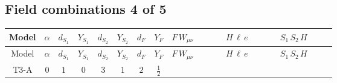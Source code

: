 \documentclass[8pt]{article}
\begin{document}
\begin{landscape}
\subsection*{Field combinations 4 of 5}
\begin{longtable}{@{}cccccccc >{\raggedright\arraybackslash}p{0.21\linewidth} >{\raggedright\arraybackslash}p{0.21\linewidth} >{\raggedright\arraybackslash}p{0.21\linewidth}@{}}
\toprule
Model & $\alpha$ & $d_{S_1}$ & $Y_{S_1}$ & $d_{S_2}$ & $Y_{S_2}$ & $d_F$ & $Y_F$ & $F\,W_{\mu\nu}$ & $H\,\ell\,e$ & $S_1\,S_2\,H$ \\
\midrule
\endfirsthead
\toprule
Model & $\alpha$ & $d_{S_1}$ & $Y_{S_1}$ & $d_{S_2}$ & $Y_{S_2}$ & $d_F$ & $Y_F$ & $F\,W_{\mu\nu}$ & $H\,\ell\,e$ & $S_1\,S_2\,H$ \\
\midrule
\endhead
T3-A & $0$ & $1$ & $0$ & $3$ & $1$ & $2$ & $\frac{1}{2}$ & \scriptsize\adjustbox{max width=\linewidth}{$\begin{gathered} -\frac{1}{2} \hbar  \log \left(\frac{\bar{\mu}^{2}}{M_F^2}\right) \left(W_{\mu _1\mu _2}^{A_1}\right){}^2\end{gathered}$} & \scriptsize\adjustbox{max width=\linewidth}{$\begin{gathered} +\frac{\hbar  \overline{y_{1,i_3,r_1}} \overline{L_{a_1,i_2}}\, P_R\, e_{i_1} H_{a_1} y_{1,i_2,r_1} Y_{e,i_3,i_1}}{4 \epsilon } \\ -\frac{1}{8} \hbar  \overline{y_{1,i_3,r_1}} \overline{L_{a_1,i_2}}\, P_R\, e_{i_1} H_{a_1} y_{1,i_2,r_1} Y_{e,i_3,i_1} \\ +\frac{\sqrt{3} \hbar  \overline{y_{2,i_3,r_1}} \overline{L_{a_1,i_2}}\, P_R\, e_{i_1} H_{a_1} y_{2,i_2,r_1} Y_{e,i_3,i_1}}{4 \epsilon }\end{gathered}$} & \scriptsize\adjustbox{max width=\linewidth}{$\begin{gathered} +\frac{2 \hbar  \overline{\lambda_{T3}} H_{a_1} H_{a_2} M_{S_1}^2 \lambda_{T3} H_{a_1}{}^{\dagger } H_{a_2}{}^{\dagger }}{\sqrt{3} \left(M_{S_1}^2-M_{S_2}^2\right)} \\ +\frac{2 \hbar  \log \left(\frac{\bar{\mu}^{2}}{M_{S_1}^2}\right) \overline{\lambda_{T3}} H_{a_1} H_{a_2} M_{S_1}^2 \lambda_{T3} H_{a_1}{}^{\dagger } H_{a_2}{}^{\dagger }}{\sqrt{3} \left(M_{S_1}^2-M_{S_2}^2\right)} \\ -\frac{2 \hbar  \overline{\lambda_{T3}} H_{a_1} H_{a_2} M_{S_2}^2 \lambda_{T3} H_{a_1}{}^{\dagger } H_{a_2}{}^{\dagger }}{\sqrt{3} \left(M_{S_1}^2-M_{S_2}^2\right)}\end{gathered}$} \\

\end{longtable}
\end{landscape}
\end{document}
